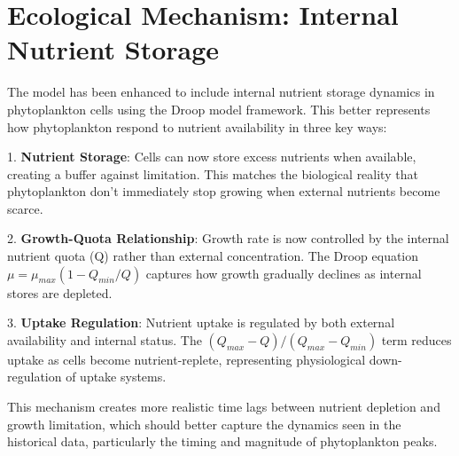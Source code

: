\section{Ecological Mechanism: Internal Nutrient Storage}

The model has been enhanced to include internal nutrient storage dynamics in phytoplankton cells using the Droop model framework. This better represents how phytoplankton respond to nutrient availability in three key ways:

1. \textbf{Nutrient Storage}: Cells can now store excess nutrients when available, creating a buffer against limitation. This matches the biological reality that phytoplankton don't immediately stop growing when external nutrients become scarce.

2. \textbf{Growth-Quota Relationship}: Growth rate is now controlled by the internal nutrient quota (Q) rather than external concentration. The Droop equation $\mu = \mu_{max}(1 - Q_{min}/Q)$ captures how growth gradually declines as internal stores are depleted.

3. \textbf{Uptake Regulation}: Nutrient uptake is regulated by both external availability and internal status. The $(Q_{max} - Q)/(Q_{max} - Q_{min})$ term reduces uptake as cells become nutrient-replete, representing physiological down-regulation of uptake systems.

This mechanism creates more realistic time lags between nutrient depletion and growth limitation, which should better capture the dynamics seen in the historical data, particularly the timing and magnitude of phytoplankton peaks.
